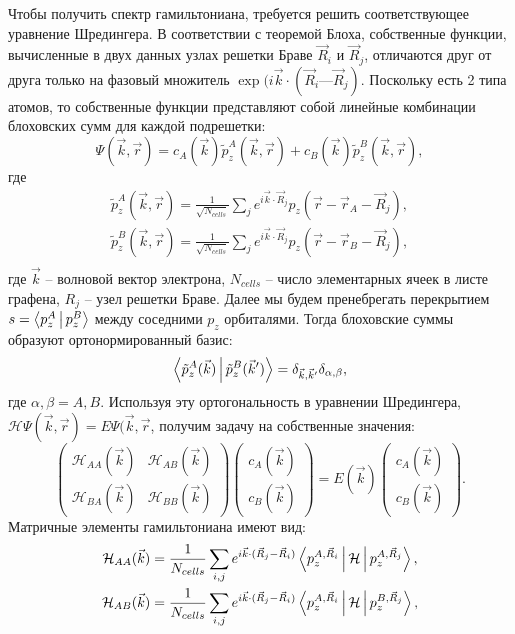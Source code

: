 Чтобы получить спектр гамильтониана, требуется решить соответствующее уравнение Шредингера. В соответствии с теоремой Блоха, собственные функции, вычисленные в двух данных узлах решетки Браве \(\vec{R}_i\) и \(\vec{R}_j\), отличаются друг от друга только на фазовый множитель \(\exp(i\vec{k}\cdot(\vec{R}_i — \vec{R}_j)\). Поскольку есть 2 типа атомов, то собственные функции представляют собой линейные комбинации блоховских сумм для каждой подрешетки:
\[
    \Psi(\vec{k},\vec{r}) =
    c_A(\vec{k})\tilde{p}_z^A(\vec{k}, \vec{r}) +
    c_B(\vec{k})\tilde{p}_z^B(\vec{k}, \vec{r}),
\]
где
\begin{gather*}
    \tilde{p}_z^A(\vec{k}, \vec{r}) = \frac{1}{\sqrt{N_{cells}}}
    \sum_j e^{i\vec{k}\cdot\vec{R}_j}
    p_z(\vec{r} - \vec{r}_A - \vec{R}_j),\\
    \tilde{p}_z^B(\vec{k}, \vec{r}) = \frac{1}{\sqrt{N_{cells}}}
    \sum_j e^{i\vec{k}\cdot\vec{R}_j}
    p_z(\vec{r} - \vec{r}_B - \vec{R}_j),\\
\end{gather*}
где \(\vec{k}\) -- волновой вектор электрона, \(N_{cells}\) -- число элементарных ячеек в листе графена, \(R_j\) -- узел решетки Браве.  Далее мы будем пренебрегать перекрытием \(s = \Braket{p_z^A|p_z^B}\) между соседними \(p_z\) орбиталями. Тогда блоховские суммы образуют ортонормированный базис:
\[
    \Braket{\tilde{p}_z^A(\vec{k})|\tilde{p}_z^B(\vec{k}')} = \delta_{\vec{k},\vec{k}'}\delta_{\alpha,\beta},
\]
где \(\alpha,\beta = A, B\). Используя эту ортогональность в уравнении Шредингера, \(\mathcal{H}\Psi(\vec{k},\vec{r}) = E\Psi(\vec{k},\vec{r}\), получим задачу на собственные значения:
\[
    \begin{pmatrix}
        \mathcal{H}_{AA}(\vec{k}) & \mathcal{H}_{AB}(\vec{k}) \\
        \mathcal{H}_{BA}(\vec{k}) & \mathcal{H}_{BB}(\vec{k})
    \end{pmatrix}
    \begin{pmatrix}
        c_A(\vec{k}) \\
        c_B(\vec{k})
    \end{pmatrix}
    =
    E(\vec{k})
    \begin{pmatrix}
        c_A(\vec{k}) \\
        c_B(\vec{k})
    \end{pmatrix}.
\]
Матричные элементы гамильтониана имеют вид:
\begin{gather*}
    \mathcal{H}_{AA}(\vec{k}) = \frac{1}{N_{cells}}
    \sum_{i,j} e^{i\vec{k}\cdot(\vec{R}_j-\vec{R}_i)}
    \Braket{p_z^{A,\vec{R}_i}|\mathcal{H}|p_z^{A,\vec{R}_j}},\\
    \mathcal{H}_{AB}(\vec{k}) = \frac{1}{N_{cells}}
    \sum_{i,j} e^{i\vec{k}\cdot(\vec{R}_j-\vec{R}_i)}
    \Braket{p_z^{A,\vec{R}_i}|\mathcal{H}|p_z^{B,\vec{R}_j}},
\end{gather*}
